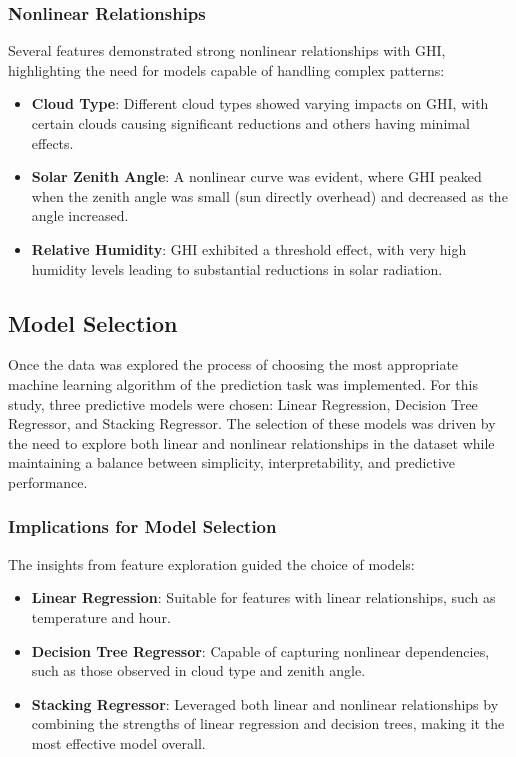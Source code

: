 \documentclass[10pt,twocolumn]{article}
\begin{document}
\subsubsection{Nonlinear Relationships}
Several features demonstrated strong nonlinear relationships with GHI, highlighting the need for models capable of handling complex patterns:
\begin{itemize}
    \item \textbf{Cloud Type}: Different cloud types showed varying impacts on GHI, with certain clouds causing significant reductions and others having minimal effects.
    \item \textbf{Solar Zenith Angle}: A nonlinear curve was evident, where GHI peaked when the zenith angle was small (sun directly overhead) and decreased as the angle increased.
    \item \textbf{Relative Humidity}: GHI exhibited a threshold effect, with very high humidity levels leading to substantial reductions in solar radiation.
\end{itemize}


\subsection{Model Selection}
Once the data was explored  the process of choosing the  most appropriate machine learning algorithm of the prediction task was implemented. For this study,  three predictive models were chosen: Linear Regression, Decision Tree Regressor, and Stacking Regressor. The selection of these models was driven by the need to explore both linear and nonlinear relationships in the dataset while maintaining a balance between simplicity, interpretability, and predictive performance.
\subsubsection{Implications for Model Selection}
The insights from feature exploration guided the choice of models:
\begin{itemize}
    \item \textbf{Linear Regression}: Suitable for features with linear relationships, such as temperature and hour.
    \item \textbf{Decision Tree Regressor}: Capable of capturing nonlinear dependencies, such as those observed in cloud type and zenith angle.
    \item \textbf{Stacking Regressor}: Leveraged both linear and nonlinear relationships by combining the strengths of linear regression and decision trees, making it the most effective model overall.
\end{itemize}
\end{document}
